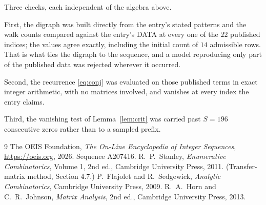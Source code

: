 \documentclass[11pt,a4paper]{article}
\theoremstyle{plain}
\theoremstyle{definition}
\begin{document}
Three checks, each independent of the algebra above.

First, the digraph was built directly from the entry's stated patterns and the walk counts
compared against the entry's DATA at every one of the $22$ published indices; the
values agree exactly, including the initial count of $14$ admissible rows. That is
what ties the digraph to the sequence, and a model reproducing only part of the published
data was rejected wherever it occurred.

Second, the recurrence \eqref{eq:conj} was evaluated on those published terms in exact
integer arithmetic, with no matrices involved, and vanishes at every index the entry claims.

Third, the vanishing test of Lemma~\ref{lem:crit} was carried past $S=196$ consecutive
zeros rather than to a sampled prefix.

\begin{thebibliography}{9}
 The OEIS Foundation, \emph{The On-Line Encyclopedia of Integer
Sequences}, \url{https://oeis.org}, 2026. Sequence A207416.
 R.~P.~Stanley, \emph{Enumerative Combinatorics}, Volume 1, 2nd ed.,
Cambridge University Press, 2011. (Transfer-matrix method, Section 4.7.)
 P.~Flajolet and R.~Sedgewick, \emph{Analytic Combinatorics}, Cambridge
University Press, 2009.
 R.~A.~Horn and C.~R.~Johnson, \emph{Matrix Analysis}, 2nd ed., Cambridge
University Press, 2013.
\end{thebibliography}
\end{document}
